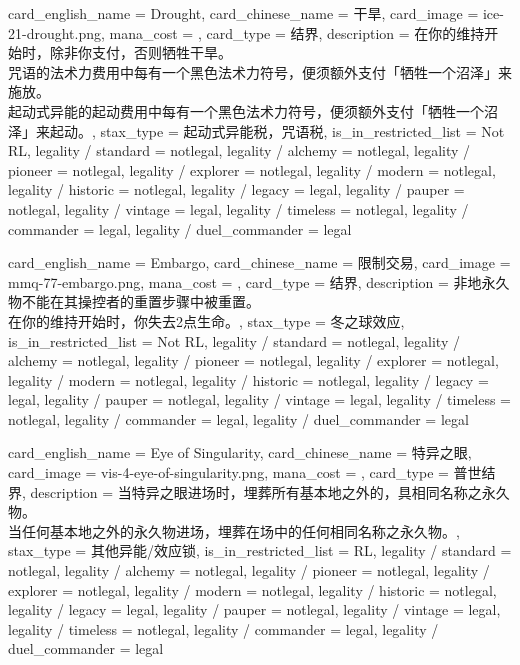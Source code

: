 \documentclass[lang = cn, color = black, 10pt]{AllThatStax}
\begin{document}
\card
{
	card_english_name = {Drought},
	card_chinese_name = {干旱},
	card_image = ice-21-drought.png,
	mana_cost = ,
	card_type = 结界,
	description = {在你的维持开始时，除非你支付，否则牺牲干旱。\\
咒语的法术力费用中每有一个黑色法术力符号，便须额外支付「牺牲一个沼泽」来施放。\\
起动式异能的起动费用中每有一个黑色法术力符号，便须额外支付「牺牲一个沼泽」来起动。},
	stax_type = 起动式异能税，咒语税,
	is_in_restricted_list = Not RL,
	legality / standard = notlegal,
	legality / alchemy = notlegal,
	legality / pioneer = notlegal,
	legality / explorer = notlegal,
	legality / modern = notlegal,
	legality / historic = notlegal,
	legality / legacy = legal,
	legality / pauper = notlegal,
	legality / vintage = legal,
	legality / timeless = notlegal,
	legality / commander = legal,
	legality / duel_commander = legal
}

\card
{
	card_english_name = {Embargo},
	card_chinese_name = {限制交易},
	card_image = mmq-77-embargo.png,
	mana_cost = ,
	card_type = 结界,
	description = {非地永久物不能在其操控者的重置步骤中被重置。\\
在你的维持开始时，你失去2点生命。},
	stax_type = 冬之球效应,
	is_in_restricted_list = Not RL,
	legality / standard = notlegal,
	legality / alchemy = notlegal,
	legality / pioneer = notlegal,
	legality / explorer = notlegal,
	legality / modern = notlegal,
	legality / historic = notlegal,
	legality / legacy = legal,
	legality / pauper = notlegal,
	legality / vintage = legal,
	legality / timeless = notlegal,
	legality / commander = legal,
	legality / duel_commander = legal
}

\card
{
	card_english_name = {Eye of Singularity},
	card_chinese_name = {特异之眼},
	card_image = vis-4-eye-of-singularity.png,
	mana_cost = ,
	card_type = 普世结界,
	description = {当特异之眼进场时，埋葬所有基本地之外的，具相同名称之永久物。\\
当任何基本地之外的永久物进场，埋葬在场中的任何相同名称之永久物。},
	stax_type = 其他异能/效应锁,
	is_in_restricted_list = RL,
	legality / standard = notlegal,
	legality / alchemy = notlegal,
	legality / pioneer = notlegal,
	legality / explorer = notlegal,
	legality / modern = notlegal,
	legality / historic = notlegal,
	legality / legacy = legal,
	legality / pauper = notlegal,
	legality / vintage = legal,
	legality / timeless = notlegal,
	legality / commander = legal,
	legality / duel_commander = legal
}
\end{document}

